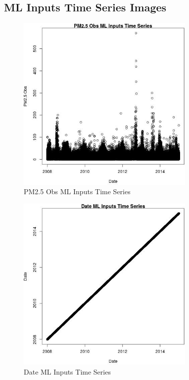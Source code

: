 
\subsection{ML Inputs Time Series Images} 
 

\begin{figure} 
\centering  
\includegraphics[width=0.77\textwidth]{Code_Outputs/ML_input_report_ML_input_PM25_Step5_part_d_de_duplicated_aves_ML_input_PM25_ObsvDate.jpg} 
\caption{\label{fig:ML_input_report_ML_input_PM25_Step5_part_d_de_duplicated_aves_ML_inputPM25_ObsvDate}PM2.5 Obs ML Inputs Time Series} 
\end{figure} 
 

\begin{figure} 
\centering  
\includegraphics[width=0.77\textwidth]{Code_Outputs/ML_input_report_ML_input_PM25_Step5_part_d_de_duplicated_aves_ML_input_DatevDate.jpg} 
\caption{\label{fig:ML_input_report_ML_input_PM25_Step5_part_d_de_duplicated_aves_ML_inputDatevDate}Date ML Inputs Time Series} 
\end{figure} 
 

